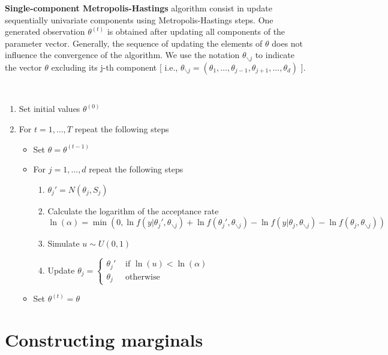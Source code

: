 \documentclass[11pt,fleqn]{book} %
\begin{document}
\textbf{Single-component Metropolis-Hastings} algorithm consist in update sequentially 
univariate components using Metropolis-Hastings steps. 
One generated observation $\theta^{(t)}$ is obtained after updating all 
components of the parameter vector. Generally, the sequence of updating the 
elements of $\theta$ does not influence the convergence of the algorithm.
We use the notation $\theta_{\backslash j}$ to indicate the vector $\theta$ 
excluding its j-th component [ i.e., $\theta_{\backslash j} = 
(\theta_1,\dots,\theta_{j-1},\theta_{j+1},\dots,\theta_{d})$ ].


\begin{algorithm} \ 
\begin{enumerate}
\item Set initial values $\theta^{(0)}$
\item For $t=1,\dots,T$ repeat the following steps
\begin{itemize}
\item Set $\theta=\theta^{(t-1)}$
\item For $j=1,\dots,d$ repeat the following steps
\begin{enumerate}[label=\alph*.]
\item $\theta_j' = N(\theta_j,S_j)$
\item Calculate the logarithm of the acceptance rate \\
      $\ln(\alpha) = \min \left( 0,
          \ln f(y|\theta_j',\theta_{\backslash j}) + 
          \ln f(\theta_j',\theta_{\backslash j}) - 
          \ln f(y|\theta_j,\theta_{\backslash j}) - 
          \ln f(\theta_j,\theta_{\backslash j})
       \right)$
\item Simulate $u \sim U(0,1)$
\item Update $\theta_j=\left\{
  \begin{array}{ll}
  \theta_j' & \textrm{ if } \ln(u) < \ln(\alpha) \\
  \theta_j  & \textrm{ otherwise }
  \end{array}\right.$ 
\end{enumerate}
\item Set $\theta^{(t)}=\theta$
\end{itemize}
\end{enumerate}
\end{algorithm}


\section{Constructing marginals}
\end{document}
